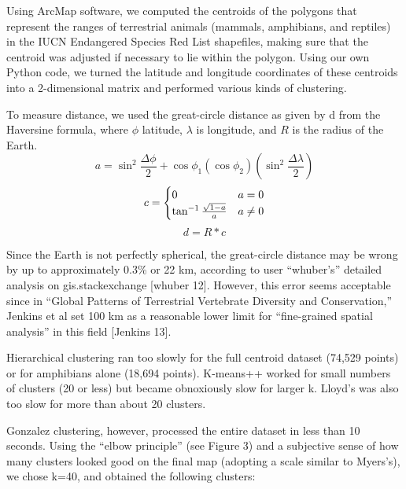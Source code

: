 \documentclass[11pt, fullpage,letterpaper]{article}
\renewcommand{\cite}[1]{[#1]}
\begin{document}
		Using ArcMap software, we computed the centroids of the polygons that represent the ranges of terrestrial animals (mammals, amphibians, and reptiles) in the IUCN Endangered Species Red List shapefiles, making sure that the centroid was adjusted if necessary to lie within the polygon. Using our own Python code, we turned the latitude and longitude coordinates of these centroids into a 2-dimensional matrix and performed various kinds of clustering.
				
		To measure distance, we used the great-circle distance as given by d from the Haversine formula, where $\phi$ latitude, $\lambda$ is longitude, and $R$ is the radius of the Earth.
		\begin{equation}
			a = \sin^2 \frac{\Delta\phi}{2} + \cos \phi_1 (\cos \phi_2)  (\sin^2 \frac{\Delta\lambda}{2})
		\end{equation}
		\begin{equation}
			c =  \begin{cases} 
					0 & a = 0 \cr \tan^{-1}{\frac{\sqrt{1-a}}{a}} & a \neq 0
				\end{cases}
		\end{equation}
		\begin{equation}
			d = R*c
		\end{equation}
	
		Since the Earth is not perfectly spherical, the great-circle distance may be wrong by up to approximately 0.3\% or 22 km, according to user ``whuber's'' detailed analysis on gis.stackexchange \cite{whuber 12}. However, this error seems acceptable since in ``Global Patterns of Terrestrial Vertebrate Diversity and Conservation,'' Jenkins et al set 100 km as a reasonable lower limit for ``fine-grained spatial analysis'' in this field \cite{Jenkins 13}.
	
		Hierarchical clustering ran too slowly for the full centroid dataset (74,529 points) or for amphibians alone (18,694 points). K-means++ worked for small numbers of clusters (20 or less) but became obnoxiously slow for larger k. Lloyd's was also too slow for more than about 20 clusters. 
		
		Gonzalez clustering, however, processed the entire dataset in less than 10 seconds. Using the “elbow principle” (see Figure 3) and a subjective sense of how many clusters looked good on the final map (adopting a scale similar to Myers's), we chose k=40, and obtained the following clusters:
\end{document}
